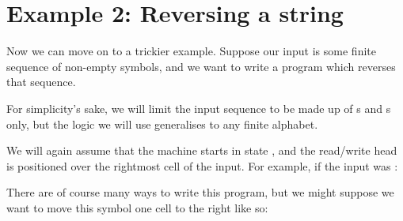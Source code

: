 \section{Example 2: Reversing a string}

Now we can move on to a trickier example. Suppose our input is some finite sequence of non-empty symbols, and we want to write a program which reverses that sequence.

For simplicity's sake, we will limit the input sequence to be made up of s and s only, but the logic we will use generalises to any finite alphabet.

We will again assume that the machine starts in state , and the read/write head is positioned over the rightmost cell of the input. For example, if the input was :

\begin{center}
\end{center}

There are of course many ways to write this program, but we might suppose we want to move this symbol one cell to the right like so:

